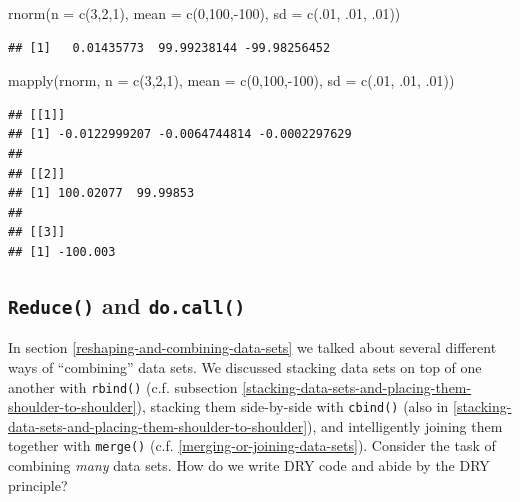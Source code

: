 \documentclass[
  12pt,
  krantz2]{krantz}
\makeatletter
\newenvironment{Shaded}{\begin{snugshade}}{\end{snugshade}}
\newcommand{\AttributeTok}[1]{\textcolor[rgb]{0.61,0.61,0.61}{#1}}
\newcommand{\DecValTok}[1]{\textcolor[rgb]{0.06,0.06,0.06}{#1}}
\newcommand{\FunctionTok}[1]{\textcolor[rgb]{0,0,0}{#1}}
\newcommand{\NormalTok}[1]{#1}
\newcommand{\SpecialCharTok}[1]{\textcolor[rgb]{0,0,0}{#1}}
\newenvironment{kframe}{%
\medskip{}
\setlength{\fboxsep}{.8em}
 \def\at@end@of@kframe{}%
 \ifinner\ifhmode%
  \def\at@end@of@kframe{\end{minipage}}%
  \begin{minipage}{\columnwidth}%
 \fi\fi%
 \def\FrameCommand##1{\hskip\@totalleftmargin \hskip-\fboxsep
 \colorbox{shadecolor}{##1}\hskip-\fboxsep
     \hskip-\linewidth \hskip-\@totalleftmargin \hskip\columnwidth}%
 \MakeFramed {\advance\hsize-\width
   \@totalleftmargin\z@ \linewidth\hsize
   \@setminipage}}%
 {\par\unskip\endMakeFramed%
 \at@end@of@kframe}
\renewenvironment{Shaded}{\begin{kframe}}{\end{kframe}}
\makeatother
\begin{document}
\begin{Shaded}
\begin{Highlighting}[]
\FunctionTok{rnorm}\NormalTok{(}\AttributeTok{n =} \FunctionTok{c}\NormalTok{(}\DecValTok{3}\NormalTok{,}\DecValTok{2}\NormalTok{,}\DecValTok{1}\NormalTok{), }\AttributeTok{mean =} \FunctionTok{c}\NormalTok{(}\DecValTok{0}\NormalTok{,}\DecValTok{100}\NormalTok{,}\SpecialCharTok{{-}}\DecValTok{100}\NormalTok{), }\AttributeTok{sd =} \FunctionTok{c}\NormalTok{(.}\DecValTok{01}\NormalTok{, .}\DecValTok{01}\NormalTok{, .}\DecValTok{01}\NormalTok{))}
\end{Highlighting}
\end{Shaded}

\begin{verbatim}
## [1]   0.01435773  99.99238144 -99.98256452
\end{verbatim}

\begin{Shaded}
\begin{Highlighting}[]
\FunctionTok{mapply}\NormalTok{(rnorm, }\AttributeTok{n =} \FunctionTok{c}\NormalTok{(}\DecValTok{3}\NormalTok{,}\DecValTok{2}\NormalTok{,}\DecValTok{1}\NormalTok{), }\AttributeTok{mean =} \FunctionTok{c}\NormalTok{(}\DecValTok{0}\NormalTok{,}\DecValTok{100}\NormalTok{,}\SpecialCharTok{{-}}\DecValTok{100}\NormalTok{), }\AttributeTok{sd =} \FunctionTok{c}\NormalTok{(.}\DecValTok{01}\NormalTok{, .}\DecValTok{01}\NormalTok{, .}\DecValTok{01}\NormalTok{))}
\end{Highlighting}
\end{Shaded}

\begin{verbatim}
## [[1]]
## [1] -0.0122999207 -0.0064744814 -0.0002297629
## 
## [[2]]
## [1] 100.02077  99.99853
## 
## [[3]]
## [1] -100.003
\end{verbatim}

\hypertarget{reduce-and-do.call}{%
\subsection{\texorpdfstring{\texttt{Reduce()} and \texttt{do.call()}}{Reduce() and do.call()}}\label{reduce-and-do.call}}

In section \ref{reshaping-and-combining-data-sets} we talked about several different ways of ``combining'' data sets. We discussed stacking data sets on top of one another with \texttt{rbind()} (c.f. subsection \ref{stacking-data-sets-and-placing-them-shoulder-to-shoulder}), stacking them side-by-side with \texttt{cbind()} (also in \ref{stacking-data-sets-and-placing-them-shoulder-to-shoulder}), and intelligently joining them together with \texttt{merge()} (c.f. \ref{merging-or-joining-data-sets}). Consider the task of combining \emph{many} data sets. How do we write DRY code and abide by the DRY principle?
\end{document}
